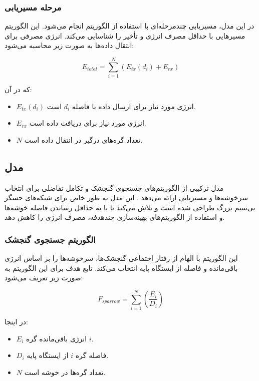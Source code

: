 \documentclass[12pt, onecolumn, a4paper]{article}
\begin{document}
\subsubsection{مرحله مسیریابی}
در این مدل، مسیریابی چندمرحله‌ای با استفاده از الگوریتم  انجام می‌شود. این الگوریتم مسیرهایی با حداقل مصرف انرژی و تأخیر را شناسایی می‌کند. انرژی مصرفی برای انتقال داده‌ها به صورت زیر محاسبه می‌شود:

\begin{equation}
	E_{total} = \sum_{i=1}^{N} \left( E_{tx}(d_{i}) + E_{rx} \right)
\end{equation}

که در آن:
\begin{itemize}
	\item $E_{tx}(d_{i})$ انرژی مورد نیاز برای ارسال داده با فاصله $d_{i}$ است.
	\item $E_{rx}$ انرژی مورد نیاز برای دریافت داده است.
	\item $N$ تعداد گره‌های درگیر در انتقال داده است.
\end{itemize}

\subsection{مدل }
مدل  ترکیبی از الگوریتم‌های جستجوی گنجشک و تکامل تفاضلی برای انتخاب سرخوشه‌ها و مسیریابی ارائه می‌دهد \cite{ref8, ref9}. این مدل به طور خاص برای شبکه‌های حسگر بی‌سیم بزرگ طراحی شده است و تلاش می‌کند تا با به حداقل رساندن فاصله خوشه‌ها و استفاده از الگوریتم‌های بهینه‌سازی چندهدفه، مصرف انرژی را کاهش دهد.

\subsubsection{الگوریتم جستجوی گنجشک}
این الگوریتم با الهام از رفتار اجتماعی گنجشک‌ها، سرخوشه‌ها را بر اساس انرژی باقی‌مانده و فاصله از ایستگاه پایه انتخاب می‌کند. تابع هدف برای این الگوریتم به صورت زیر تعریف می‌شود:

\begin{equation}
	F_{sparrow} = \sum_{i=1}^{N} \left( \frac{E_i}{D_i} \right)
\end{equation}

در اینجا:
\begin{itemize}
	\item $E_i$ انرژی باقی‌مانده گره $i$.
	\item $D_i$ فاصله گره $i$ از ایستگاه پایه.
	\item $N$ تعداد گره‌ها در خوشه است.
\end{itemize}
\end{document}
